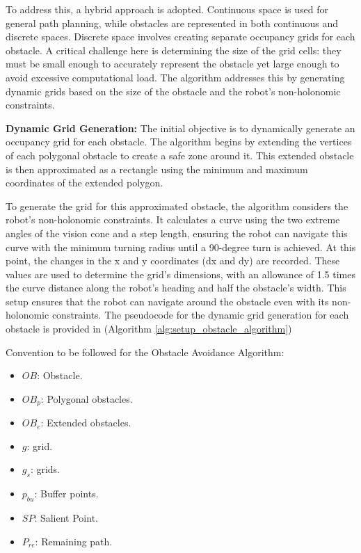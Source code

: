\vspace*{6mm}  

To address this, a hybrid approach is adopted. Continuous space is used for general path planning, while obstacles are represented in both continuous and discrete spaces. Discrete space involves creating separate occupancy grids for each obstacle. A critical challenge here is determining the size of the grid cells: they must be small enough to accurately represent the obstacle yet large enough to avoid excessive computational load. The algorithm addresses this by generating dynamic grids based on the size of the obstacle and the robot's non-holonomic constraints.

\vspace*{6mm}  

\textbf{Dynamic Grid Generation:}
The initial objective is to dynamically generate an occupancy grid for each obstacle. The algorithm begins by extending the vertices of each polygonal obstacle to create a safe zone around it. This extended obstacle is then approximated as a rectangle using the minimum and maximum coordinates of the extended polygon.

\vspace*{6mm}  

To generate the grid for this approximated obstacle, the algorithm considers the robot's non-holonomic constraints. It calculates a curve using the two extreme angles of the vision cone and a step length, ensuring the robot can navigate this curve with the minimum turning radius until a 90-degree turn is achieved. At this point, the changes in the x and y coordinates (dx and dy) are recorded. These values are used to determine the grid's dimensions, with an allowance of 1.5 times the curve distance along the robot's heading and half the obstacle's width. This setup ensures that the robot can navigate around the obstacle even with its non-holonomic constraints. The pseudocode for the dynamic grid generation for each obstacle is provided in (Algorithm \autoref{alg:setup_obstacle_algorithm})

\vspace*{6mm}  

Convention to be followed for the Obstacle Avoidance Algorithm:
\begin{multicols}{2}
\begin{itemize}[noitemsep,topsep=0pt]
    \item $OB$: Obstacle.
    \item $OB_p$: Polygonal obstacles.
    \item $OB_e$: Extended obstacles.
    \item $g$: grid.
    \item $g_s$: grids.
    \item $p_{bu}$: Buffer points.
    \item $SP$: Salient Point.
    \item $P_{re}$: Remaining path.
\end{itemize}
\end{multicols}
    
